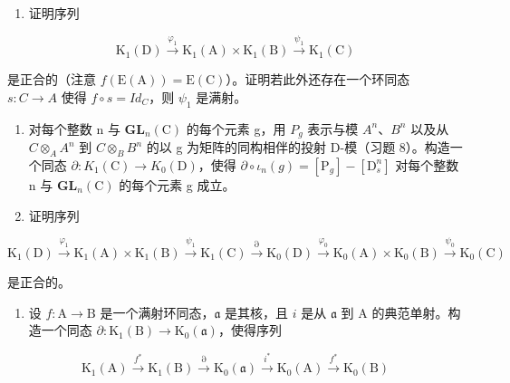 \begin{enumerate}
\def\labelenumi{\alph{enumi})}
\tightlist
\item
  证明序列
\end{enumerate}

\[
\mathrm{K} _ {1} (\mathrm{D}) \xrightarrow {\varphi_ {1}} \mathrm{K} _ {1} (\mathrm{A}) \times \mathrm{K} _ {1} (\mathrm{B}) \xrightarrow {\psi_ {1}} \mathrm{K} _ {1} (\mathrm{C})
\]

是正合的（注意 \(f(\mathrm{E}(\mathrm{A})) = \mathrm{E}(\mathrm{C})\)）。证明若此外还存在一个环同态 \(s : C \to A\) 使得 \(f \circ s = Id_{C}\)，则 \(\psi_{1}\) 是满射。

\begin{enumerate}
\def\labelenumi{\alph{enumi})}
\setcounter{enumi}{1}
\item
  对每个整数 n 与 \(\mathbf{GL}_{n}(\mathrm{C})\) 的每个元素 g，用 \(P_{g}\) 表示与模 \(A^{n}\)、\(B^{n}\) 以及从 \(C \otimes_{A} A^{n}\) 到 \(C \otimes_{B} B^{n}\) 的以 g 为矩阵的同构相伴的投射 D-模（习题 8）。构造一个同态 \(\partial : K_{1}(\mathrm{C}) \to K_{0}(\mathrm{D})\)，使得 \(\partial \circ \iota_{n}(g) = [\mathrm{P}_{g}] - [\mathrm{D}_{s}^{n}]\) 对每个整数 n 与 \(\mathbf{GL}_{n}(\mathrm{C})\) 的每个元素 g 成立。
\item
  证明序列
\end{enumerate}

\[
\mathrm{K} _ {1} (\mathrm{D}) \xrightarrow {\varphi_ {1}} \mathrm{K} _ {1} (\mathrm{A}) \times \mathrm{K} _ {1} (\mathrm{B}) \xrightarrow {\psi_ {1}} \mathrm{K} _ {1} (\mathrm{C}) \xrightarrow {\partial} \mathrm{K} _ {0} (\mathrm{D}) \xrightarrow {\varphi_ {0}} \mathrm{K} _ {0} (\mathrm{A}) \times \mathrm{K} _ {0} (\mathrm{B}) \xrightarrow {\psi_ {0}} \mathrm{K} _ {0} (\mathrm{C})
\]

是正合的。

\begin{enumerate}
\def\labelenumi{\arabic{enumi})}
\setcounter{enumi}{11}
\tightlist
\item
  设 \(f: \mathrm{A} \to \mathrm{B}\) 是一个满射环同态，\(\mathfrak{a}\) 是其核，且 \(i\) 是从 \(\mathfrak{a}\) 到 \(\mathrm{A}\) 的典范单射。构造一个同态 \(\partial: \mathrm{K}_1(\mathrm{B}) \to \mathrm{K}_0(\mathfrak{a})\)，使得序列
\end{enumerate}

\[
\mathrm{K} _ {1} (\mathrm{A}) \xrightarrow {f ^ {*}} \mathrm{K} _ {1} (\mathrm{B}) \xrightarrow {\partial} \mathrm{K} _ {0} (\mathfrak {a}) \xrightarrow {i ^ {*}} \mathrm{K} _ {0} (\mathrm{A}) \xrightarrow {f ^ {*}} \mathrm{K} _ {0} (\mathrm{B})
\]

